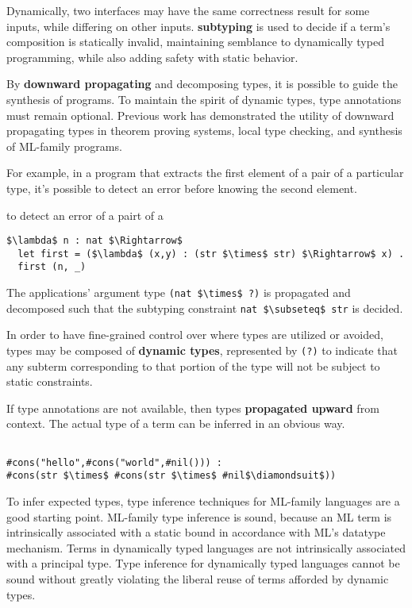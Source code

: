 \documentclass[sigplan,screen]{acmart}
\begin{document}
Dynamically, two interfaces may have the same correctness result for some inputs,
while differing on other inputs. \textbf{subtyping} is used to decide if a term's 
composition is statically invalid, maintaining semblance to dynamically typed programming,
while also adding safety with static behavior.

By \textbf{downward propagating} and decomposing types, 
it is possible to guide the synthesis of programs.
To maintain the spirit of dynamic types, type annotations must remain optional.
Previous work has demonstrated the utility of downward propagating types 
in theorem proving systems, local type checking, 
and synthesis of ML-family programs.

For example, in a program that extracts 
the first element of a pair of a particular type, 
it's possible to detect an error before knowing the second element.

to detect an error of a pairt of a   
\begin{lstlisting}
$\lambda$ n : nat $\Rightarrow$
  let first = ($\lambda$ (x,y) : (str $\times$ str) $\Rightarrow$ x) .
  first (n, _) 
\end{lstlisting}

\noindent The  applications' argument type \lstinline{(nat $\times$ ?)} 
is propagated and decomposed such that the subtyping constraint 
\lstinline{nat $\subseteq$ str} is decided. 

In order to have fine-grained control over where types are utilized or avoided, 
types may be composed of \textbf{dynamic types}, represented by \lstinline{(?)} to indicate 
that any subterm corresponding to that portion of the type 
will not be subject to static constraints.

If type annotations are not available, then types \textbf{propagated upward} from context. 
The actual type of a term can be inferred in an obvious way.

\begin{lstlisting}

#cons("hello",#cons("world",#nil())) : 
#cons(str $\times$ #cons(str $\times$ #nil$\diamondsuit$))

\end{lstlisting}

To infer expected types, type inference techniques for ML-family languages 
are a good starting point.
ML-family type inference is sound, because an ML term is 
intrinsically associated with a static bound in accordance with ML's datatype mechanism.
Terms in dynamically typed languages are not intrinsically associated with a principal type. 
Type inference for dynamically typed languages cannot be sound without greatly violating the 
liberal reuse of terms afforded by dynamic types. 
\end{document}
